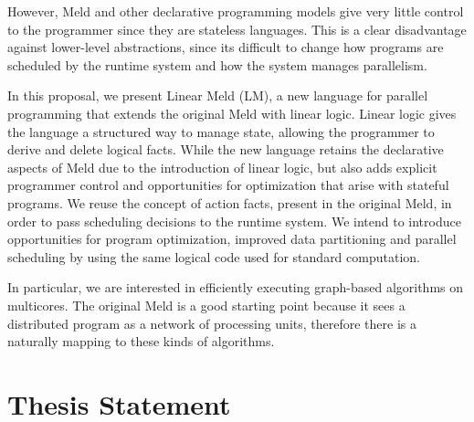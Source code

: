 However, Meld and other declarative programming models give very little control to the programmer since they are stateless languages.
This is a clear disadvantage against lower-level abstractions, since its difficult to change how programs are scheduled by
the runtime system and how the system manages parallelism.

In this proposal, we present Linear Meld (LM), a new language for parallel programming that extends the
original Meld with linear logic. Linear logic gives the language a structured
way to manage state, allowing the programmer to derive and delete logical facts.
While the new language retains the declarative aspects of Meld due to the introduction of linear logic, but also adds explicit programmer control and opportunities for optimization that arise with stateful programs.
We reuse the concept of action facts, present in the original Meld, in order to pass scheduling decisions to
the runtime system. We intend to introduce opportunities for program optimization, improved data partitioning and
parallel scheduling by using the same logical code used for standard computation.

In particular, we are interested in efficiently executing graph-based algorithms on multicores. The original Meld is a good
starting point because it sees a distributed program as a network of processing units, therefore
there is a naturally mapping to these kinds of algorithms.

\section{Thesis Statement}



